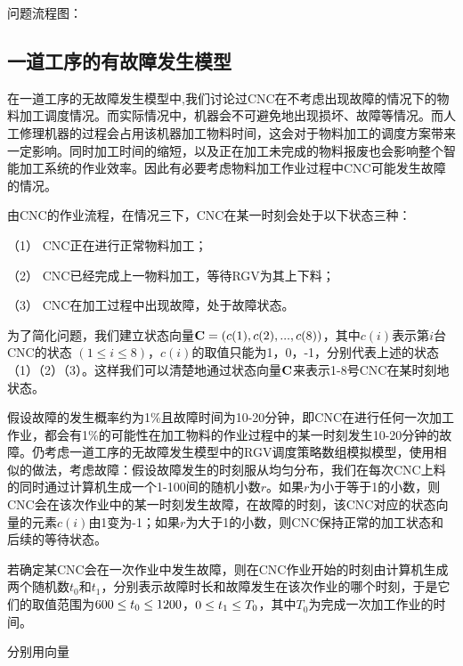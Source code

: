 \documentclass[withoutpreface,bwprint]{cumcmthesis} %
\begin{document}
问题流程图：












\subsection{一道工序的有故障发生模型}

在一道工序的无故障发生模型中,我们讨论过CNC在不考虑出现故障的情况下的物料加工调度情况。而实际情况中，机器会不可避免地出现损坏、故障等情况。而人工修理机器的过程会占用该机器加工物料时间，这会对于物料加工的调度方案带来一定影响。同时加工时间的缩短，以及正在加工未完成的物料报废也会影响整个智能加工系统的作业效率。因此有必要考虑物料加工作业过程中CNC可能发生故障的情况。

由CNC的作业流程，在情况三下，CNC在某一时刻会处于以下状态三种：

（1）	CNC正在进行正常物料加工；

（2）	CNC已经完成上一物料加工，等待RGV为其上下料；

（3）	CNC在加工过程中出现故障，处于故障状态。

为了简化问题，我们建立状态向量${\bf{C}} = (c(1),c(2),...,c(8))$，其中$c(i)$表示第$i $台CNC的状态 $ (1 \le i \le 8) $，$c(i)$的取值只能为1，0，-1，分别代表上述的状态（1）（2）（3）。这样我们可以清楚地通过状态向量${\bf{C}}$来表示1-8号CNC在某时刻地状态。

假设故障的发生概率约为1\%且故障时间为10-20分钟，即CNC在进行任何一次加工作业，都会有1\%的可能性在加工物料的作业过程中的某一时刻发生10-20分钟的故障。仍考虑一道工序的无故障发生模型中的RGV调度策略数组模拟模型，使用相似的做法，考虑故障：假设故障发生的时刻服从均匀分布，我们在每次CNC上料的同时通过计算机生成一个1-100间的随机小数$r$。如果$r$为小于等于1的小数，则CNC会在该次作业中的某一时刻发生故障，在故障的时刻，该CNC对应的状态向量的元素$c(i)$由1变为-1；如果$r$为大于1的小数，则CNC保持正常的加工状态和后续的等待状态。

若确定某CNC会在一次作业中发生故障，则在CNC作业开始的时刻由计算机生成两个随机数${t_0}$和${t_1}$，分别表示故障时长和故障发生在该次作业的哪个时刻，于是它们的取值范围为${\rm{600}} \le {t_0} \le {\rm{1200}}$，${\rm{0}} \le {t_{\rm{1}}} \le {T_0}$，其中${T_0}$为完成一次加工作业的时间。

分别用向量
\end{document}
